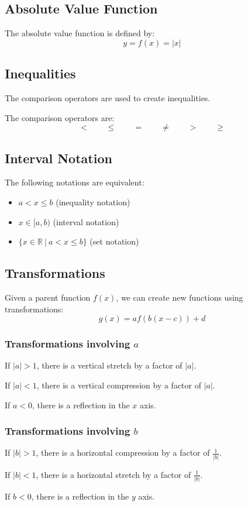 		\subsection{Absolute Value Function}
			The absolute value function is defined by:
			\[y = f(x) = |x|\]
		\subsection{Inequalities}
			The comparison operators are used to create inequalities.

			The comparison operators are:
			\[< \qquad \leq \qquad = \qquad \neq \qquad > \qquad \geq\]
		\subsection{Interval Notation}
			The following notations are equivalent:
			\begin{itemize}
				\item $a < x \leq b$ (inequality notation)
				\item $x \in [a, b)$ (interval notation)
				\item $\{x \in \mathbb{R}\ |\ a < x \leq b\}$ (set notation)
			\end{itemize}
		\subsection{Transformations}
			\label{subsec:transform}
			Given a parent function $f(x)$, we can create new functions using transformations:
			\[g(x) = af(b(x - c)) + d\]
			\subsubsection{Transformations involving $a$}
				If $|a| > 1$, there is a vertical stretch by a factor of $|a|$.

				If $|a| < 1$, there is a vertical compression by a factor of $|a|$.

				If $a < 0$, there is a reflection in the $x$ axis.
			\subsubsection{Transformations involving $b$}
				If $|b| > 1$, there is a horizontal compression by a factor of $\frac{1}{|b|}$.

				If $|b| < 1$, there is a horizontal stretch by a factor of $\frac{1}{|b|}$.

				If $b < 0$, there is a reflection in the $y$ axis.
